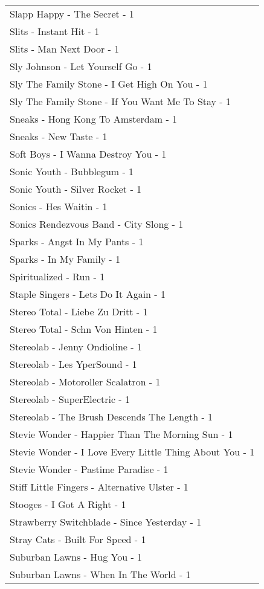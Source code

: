 \documentclass[
]{article}
\begin{document}
\begin{longtable}{l}
Slapp Happy - The Secret - 1 \\ 
Slits - Instant Hit - 1 \\ 
Slits - Man Next Door - 1 \\ 
Sly Johnson - Let Yourself Go - 1 \\ 
Sly The Family Stone - I Get High On You - 1 \\ 
Sly The Family Stone - If You Want Me To Stay - 1 \\ 
Sneaks - Hong Kong To Amsterdam - 1 \\ 
Sneaks - New Taste - 1 \\ 
Soft Boys - I Wanna Destroy You - 1 \\ 
Sonic Youth - Bubblegum - 1 \\ 
Sonic Youth - Silver Rocket - 1 \\ 
Sonics - Hes Waitin - 1 \\ 
Sonics Rendezvous Band - City Slong - 1 \\ 
Sparks - Angst In My Pants - 1 \\ 
Sparks - In My Family - 1 \\ 
Spiritualized - Run - 1 \\ 
Staple Singers - Lets Do It Again - 1 \\ 
Stereo Total - Liebe Zu Dritt - 1 \\ 
Stereo Total - Schn Von Hinten - 1 \\ 
Stereolab - Jenny Ondioline - 1 \\ 
Stereolab - Les YperSound - 1 \\ 
Stereolab - Motoroller Scalatron - 1 \\ 
Stereolab - SuperElectric - 1 \\ 
Stereolab - The Brush Descends The Length - 1 \\ 
Stevie Wonder - Happier Than The Morning Sun - 1 \\ 
Stevie Wonder - I Love Every Little Thing About You - 1 \\ 
Stevie Wonder - Pastime Paradise - 1 \\ 
Stiff Little Fingers - Alternative Ulster - 1 \\ 
Stooges - I Got A Right - 1 \\ 
Strawberry Switchblade - Since Yesterday - 1 \\ 
Stray Cats - Built For Speed - 1 \\ 
Suburban Lawns - Hug You - 1 \\ 
Suburban Lawns - When In The World - 1 \\ 

\end{longtable}
\end{document}
